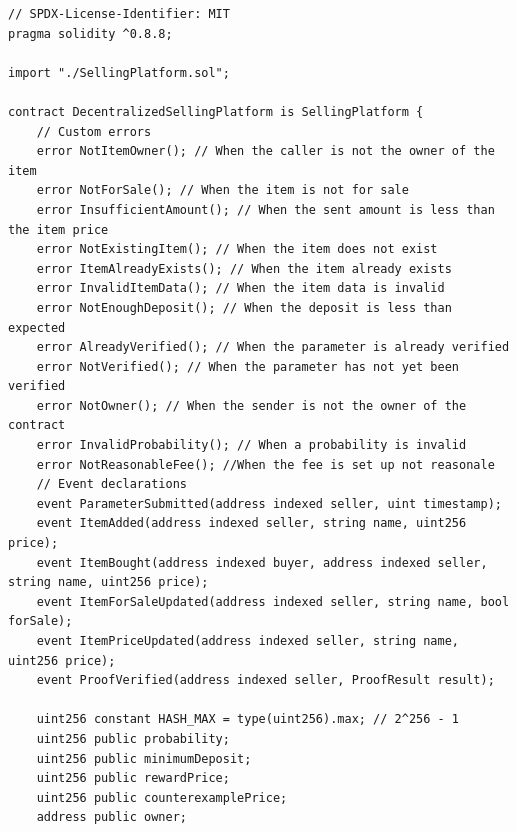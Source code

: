 \documentclass[runningheads]{llncs}
\begin{document}
\begin{lstlisting}[numbers=none]
// SPDX-License-Identifier: MIT
pragma solidity ^0.8.8;

import "./SellingPlatform.sol";

contract DecentralizedSellingPlatform is SellingPlatform {
    // Custom errors
    error NotItemOwner(); // When the caller is not the owner of the item
    error NotForSale(); // When the item is not for sale
    error InsufficientAmount(); // When the sent amount is less than the item price
    error NotExistingItem(); // When the item does not exist
    error ItemAlreadyExists(); // When the item already exists
    error InvalidItemData(); // When the item data is invalid
    error NotEnoughDeposit(); // When the deposit is less than expected
    error AlreadyVerified(); // When the parameter is already verified
    error NotVerified(); // When the parameter has not yet been verified
    error NotOwner(); // When the sender is not the owner of the contract
    error InvalidProbability(); // When a probability is invalid
    error NotReasonableFee(); //When the fee is set up not reasonale
    // Event declarations
    event ParameterSubmitted(address indexed seller, uint timestamp);
    event ItemAdded(address indexed seller, string name, uint256 price);
    event ItemBought(address indexed buyer, address indexed seller, string name, uint256 price);
    event ItemForSaleUpdated(address indexed seller, string name, bool forSale);
    event ItemPriceUpdated(address indexed seller, string name, uint256 price);
    event ProofVerified(address indexed seller, ProofResult result);

    uint256 constant HASH_MAX = type(uint256).max; // 2^256 - 1
    uint256 public probability;
    uint256 public minimumDeposit;
    uint256 public rewardPrice;
    uint256 public counterexamplePrice;
    address public owner;


\end{lstlisting}
\end{document}
